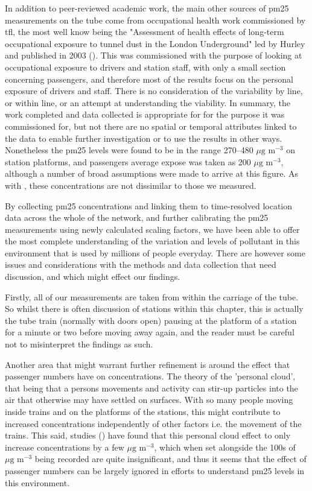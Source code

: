 In addition to peer-reviewed academic work, the main other sources of \gls{pm25} measurements on the tube come from occupational health work commissioned by \gls{tfl}, the most well know being the "Assessment of health effects of long-term occupational exposure to tunnel dust in the London Underground" led by Hurley and published in 2003 (\cite{Hurley2003}). This was commissioned with the purpose of looking at occupational exposure to drivers and station staff, with only a small section concerning passengers, and therefore most of the results focus on the personal exposure of drivers and staff. There is no consideration of the variability by line, or within line, or an attempt at understanding the viability. In summary, the work completed and data collected is appropriate for for the purpose it was commissioned for, but not there are no spatial or temporal attributes linked to the data to enable further investigation or to use the results in other ways. Nonetheless the \gls{pm25} levels were found to be in the range 270--480 $\mu \text{g m}^{-3}$ on station platforms, and passengers average expose was taken as 200 $\mu \text{g m}^{-3}$, although a number of broad assumptions were made to arrive at this figure. As with \cite{Nieuwenhuijsen2007}, these concentrations are not dissimilar to those we measured.

By collecting \gls{pm25} concentrations and linking them to time-resolved location data across the whole of the network, and further calibrating the \gls{pm25} measurements using newly calculated scaling factors, we have been able to offer the most complete understanding of the variation and levels of pollutant in this environment that is used by millions of people everyday. There are however some issues and considerations with the methods and data collection that need discussion, and which might effect our findings. 

Firstly, all of our measurements are taken from within the carriage of the tube. So whilst there is often discussion of stations within this chapter, this is actually the tube train (normally with doors open) pausing at the platform of a station for a minute or two before moving away again, and the reader must be careful not to misinterpret the findings as such. 

Another area that might warrant further refinement is around the effect that passenger numbers have on concentrations. The theory of the 'personal cloud', that being that a persons movements and activity can stir-up particles into the air that otherwise may have settled on surfaces. With so many people moving inside trains and on the platforms of the stations, this might contribute to increased concentrations independently of other factors i.e. the movement of the trains. This said, studies (\cite{Ferro2004a}) have found that this personal cloud effect to only increase concentrations by a few $\mu \text{g m}^{-3}$, which when set alongside the 100s of $\mu \text{g m}^{-3}$ being recorded are quite insignificant, and thus it seems that the effect of passenger numbers can be largely ignored in efforts to understand \gls{pm25} levels in this environment.

